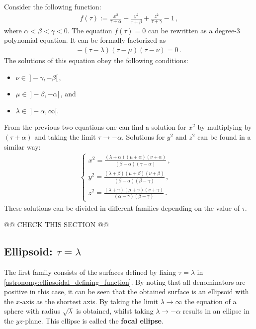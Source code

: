     Consider the following function:
    \begin{gather}
        \label{astronomy:ellipsoidal_defining_function}
        f(\tau) := \frac{x^2}{\tau + \alpha} + \frac{y^2}{\tau + \beta} + \frac{z^2}{\tau + \gamma} - 1\,,
    \end{gather}
    where $\alpha<\beta<\gamma<0$. The equation $f(\tau)=0$ can be rewritten as a degree-3 polynomial equation. It can be formally factorized as
    \begin{gather}
        -(\tau-\lambda)(\tau-\mu)(\tau-\nu) = 0\,.
    \end{gather}
    The solutions of this equation obey the following conditions:
    \begin{itemize}
        \item $\nu\in\ ]-\gamma,-\beta[$\,,
        \item $\mu\in\ ]-\beta,-\alpha[$\,, and
        \item $\lambda\in\ ]-\alpha,\infty[$.
    \end{itemize}
    From the previous two equations one can find a solution for $x^2$ by multiplying by $(\tau+\alpha)$ and taking the limit $\tau\rightarrow-\alpha$. Solutions for $y^2$ and $z^2$ can be found in a similar way:
    \begin{gather}
        \label{astronomy:ellipsoidal_coordinates}
        \begin{cases}
            x^2 = \frac{(\lambda + \alpha)(\mu + \alpha)(\nu + \alpha)}{(\beta - \alpha)(\gamma - \alpha)}\,,&\\
            y^2 = \frac{(\lambda + \beta)(\mu + \beta)(\nu + \beta)}{(\beta - \alpha)(\beta - \gamma)}\,,&\\
            z^2 = \frac{(\lambda + \gamma)(\mu + \gamma)(\nu + \gamma)}{(\alpha - \gamma)(\beta - \gamma)}\,.&
        \end{cases}
    \end{gather}
    These solutions can be divided in different families depending on the value of $\tau$.

    @@ CHECK THIS SECTION @@

\subsection{Ellipsoid: \texorpdfstring{$\tau=\lambda$}{tau equals lambda}}

    The first family consists of the surfaces defined by fixing $\tau=\lambda$ in \cref{astronomy:ellipsoidal_defining_function}. By noting that all denominators are positive in this case, it can be seen that the obtained surface is an ellipsoid with the $x$-axis as the shortest axis. By taking the limit $\lambda\longrightarrow\infty$ the equation of a sphere with radius $\sqrt{\lambda}$ is obtained, whilst taking $\lambda\longrightarrow-\alpha$ results in an ellipse in the $yz$-plane. This ellipse is called the \textbf{focal ellipse}.

